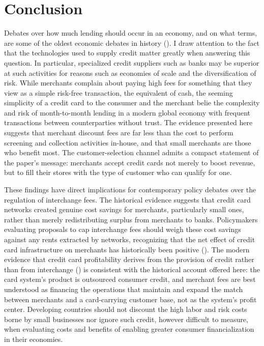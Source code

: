 \documentclass[12pt,english]{article}
\begin{document}
\section{Conclusion}\label{sec:conclusion}

Debates over how much lending should occur in an economy, and on what terms, are some of the oldest economic debates in history (\cite{glaeser_neither_1998}). I draw attention to the fact that the technologies used to supply credit matter greatly when answering this question. In particular, specialized credit suppliers such as banks may be superior at such activities for reasons such as economies of scale and the diversification of risk. While merchants complain about paying high fees for something that they view as a simple risk-free transaction, the equivalent of cash, the seeming simplicity of a credit card to the consumer and the merchant belie the complexity and risk of month-to-month lending in a modern global economy with frequent transactions between counterparties without trust. The evidence presented here suggests that merchant discount fees are far less than the cost to perform screening and collection activities in-house, and that small merchants are those who benefit most. The customer-selection channel admits a compact statement of the paper's message: merchants accept credit cards not merely to boost revenue, but to fill their stores with the type of customer who can qualify for one.

These findings have direct implications for contemporary policy debates over the regulation of interchange fees. The historical evidence suggests that credit card networks created genuine cost savings for merchants, particularly small ones, rather than merely redistributing surplus from merchants to banks. Policymakers evaluating proposals to cap interchange fees should weigh these cost savings against any rents extracted by networks, recognizing that the net effect of credit card infrastructure on merchants has historically been positive (\cite{wang_regulating_2023}). The modern evidence that credit card profitability derives from the provision of credit rather than from interchange (\cite{adams_credit_2022}) is consistent with the historical account offered here: the card system's product is outsourced consumer credit, and merchant fees are best understood as financing the operations that maintain and expand the match between merchants and a card-carrying customer base, not as the system's profit center. Developing countries should not discount the high labor and risk costs borne by small businesses nor ignore such credit, however difficult to measure, when evaluating costs and benefits of enabling greater consumer financialization in their economies.
\end{document}
